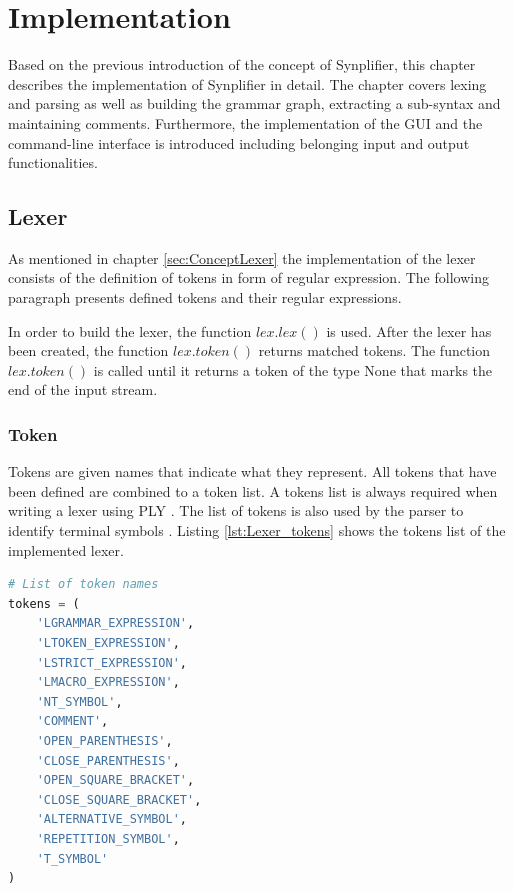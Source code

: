 

\chapter{Implementation}\label{cha:Implementation}

Based on the previous introduction of the concept of Synplifier, this chapter describes the implementation of Synplifier in detail. The chapter covers lexing and parsing as well as building the grammar graph, extracting a sub-syntax and maintaining comments. Furthermore, the implementation of the GUI and the command-line interface is introduced including belonging input and output functionalities.

\section{Lexer}\label{sec:ImplementationLexer}

As mentioned in chapter \ref{sec:ConceptLexer} the implementation of the lexer consists of the definition of tokens in form of regular expression. The following paragraph presents defined tokens and their regular expressions.

In order to build the lexer, the function $lex.lex()$ is used. After the lexer has been created, the function $lex.token()$ returns matched tokens. The function $lex.token()$ is called until it returns a token of the type None that marks the end of the input stream. 

\subsection{Token}\label{sec:ImplementationLexerToken}

Tokens are given names that indicate what they represent. All tokens that have been defined are combined to a token list.   A tokens list is always required when writing a lexer using \ac{PLY} \cite{PLY}. The list of tokens is also used by the parser to identify terminal symbols \cite{PLY}. Listing \ref{lst:Lexer_tokens} shows the tokens list of the implemented lexer. \\

\begin{lstlisting}[language=Python,basicstyle=\scriptsize	,caption= Lexer tokens,label= lst:Lexer_tokens]
# List of token names
tokens = (
    'LGRAMMAR_EXPRESSION',
    'LTOKEN_EXPRESSION',
    'LSTRICT_EXPRESSION',
    'LMACRO_EXPRESSION',
    'NT_SYMBOL',
    'COMMENT',
    'OPEN_PARENTHESIS',
    'CLOSE_PARENTHESIS',
    'OPEN_SQUARE_BRACKET',
    'CLOSE_SQUARE_BRACKET',
    'ALTERNATIVE_SYMBOL',
    'REPETITION_SYMBOL',
    'T_SYMBOL'
)
\end{lstlisting}

